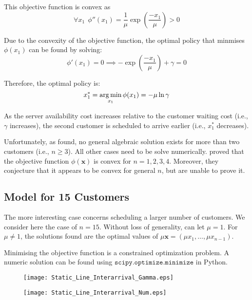 This objective function is convex as
\begin{equation}
	\forall x_{1} \ \ \phi'' (x_{1}) = \frac{1}{\mu} \exp \left( \frac{- x_{1}}{\mu} \right) > 0
\end{equation}

Due to the convexity of the objective function, the optimal policy that minmises $\phi (x_{1})$ can be found by solving:
\begin{equation}
	\phi' (x_{1}) = 0 \implies - \exp \left( \frac{- x_{1}}{\mu} \right) + \gamma = 0
\end{equation}

Therefore, the optimal policy is:
\begin{equation}
	x_{1}^{*} = \operatorname*{arg\,min}_{x_{1}} \phi (x_{1}) = - \mu \ln \gamma
\end{equation}

As the server availability cost increases relative to the customer waiting cost (i.e., $\gamma$ increases), the second customer is scheduled to arrive earlier (i.e., $x_{1}^{*}$ decreases).

Unfortunately, as \citet{Pegden} found, no general algebraic solution exists for more than two customers (i.e., $n \geq 3$). All other cases need to be solve numerically. \citet{Pegden} proved that the objective function $\phi (\mathbf{x})$ is convex for $n = 1, 2, 3, 4$. Moreover, they conjecture that it appears to be convex for general $n$, but are unable to prove it.

\subsection{Model for 15 Customers}
The more interesting case concerns scheduling a larger number of customers. We consider here the case of $n = 15$. Without loss of generality, can let $\mu = 1$. For $\mu \neq 1$, the solutions found are the optimal values of $\mu \mathbf{x} = (\mu x_{1}, \ldots, \mu x_{n - 1})$.

Minimising the objective function is a constrained optimization problem. A numeric solution can be found using $\texttt{scipy.optimize.minimize}$ in Python.

\begin{figure}[htb]
	\centering
	\texttt{[image: Static\_Line\_Interarrival\_Gamma.eps]}
	\caption{}
\end{figure}

\begin{figure}[htb]
	\centering
	\texttt{[image: Static\_Line\_Interarrival\_Num.eps]}
	\caption{}
\end{figure}











































